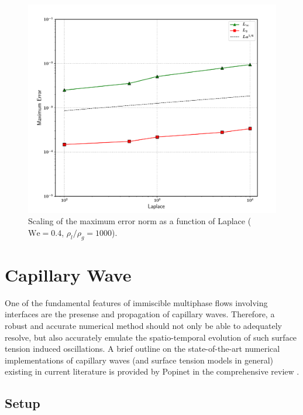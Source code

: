 \begin{figure}
    \centering
    \includegraphics[width = 1.0\textwidth]{plots/droplet_advect/laplaces.pdf}
	\caption{ Scaling of the maximum error norm as a function of Laplace ($\textrm{We} = 0.4$, $\rho_l / \rho_g = 1000$). }
    \label{lap}
\end{figure}




\section{Capillary Wave}
One of the fundamental features of immiscible multiphase flows involving interfaces are the presense and propagation of capillary waves. Therefore, a robust and accurate numerical method should not only be able to adequately resolve, but also accurately emulate the spatio-temporal evolution of such surface tension induced oscillations. A brief outline on the state-of-the-art numerical implementations of capillary waves (and surface tension models in general) existing in current literature is provided by Popinet in the comprehensive review .

\subsection*{Setup}

